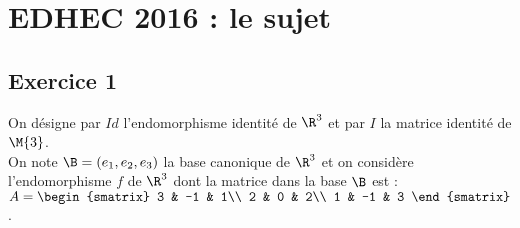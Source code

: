 \chapter*{EDHEC 2016 : le sujet}
  
%

\section*{Exercice 1}
\noindent
On désigne par $Id$ l'endomorphisme identité de $\R^3$ et par $I$ la
matrice identité de $\M{3}$. \\
On note $\B = (e_{1},e_{2},e_{3})$ la base canonique de $\R^3$ et on
considère l'endomorphisme $f$ de $\R^3$ dont la matrice dans la base
$\B$ est : $A =
\begin{smatrix}
  3 & -1 & 1\\
  2 & 0 & 2\\
  1 & -1 & 3
\end{smatrix}
$. 
